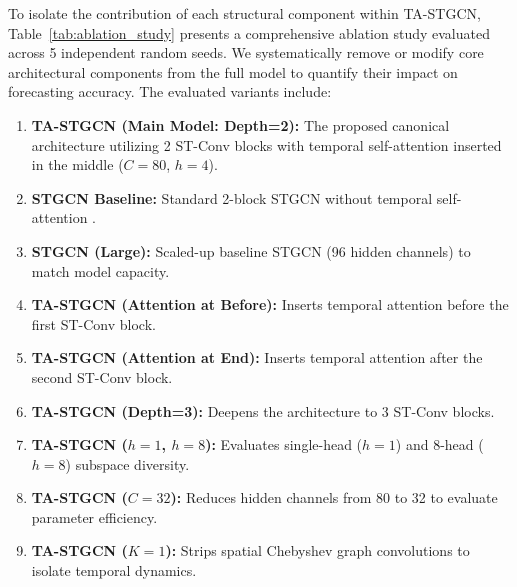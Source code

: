 \documentclass[journal,twocolumn]{IEEEtran}
\begin{document}
To isolate the contribution of each structural component within TA-STGCN, Table~\ref{tab:ablation_study} presents a comprehensive ablation study evaluated across 5 independent random seeds. We systematically remove or modify core architectural components from the full model to quantify their impact on forecasting accuracy. The evaluated variants include:
\begin{enumerate}
    \item \textbf{TA-STGCN (Main Model: Depth=2):} The proposed canonical architecture utilizing 2 ST-Conv blocks with temporal self-attention inserted in the middle ($C=80$, $h=4$).
    \item \textbf{STGCN Baseline:} Standard 2-block STGCN without temporal self-attention \cite{stgcn}.
    \item \textbf{STGCN (Large):} Scaled-up baseline STGCN (96 hidden channels) to match model capacity.
    \item \textbf{TA-STGCN (Attention at Before):} Inserts temporal attention before the first ST-Conv block.
    \item \textbf{TA-STGCN (Attention at End):} Inserts temporal attention after the second ST-Conv block.
    \item \textbf{TA-STGCN (Depth=3):} Deepens the architecture to 3 ST-Conv blocks.
    \item \textbf{TA-STGCN ($h=1$, $h=8$):} Evaluates single-head ($h=1$) and 8-head ($h=8$) subspace diversity.
    \item \textbf{TA-STGCN ($C=32$):} Reduces hidden channels from 80 to 32 to evaluate parameter efficiency.
    \item \textbf{TA-STGCN ($K=1$):} Strips spatial Chebyshev graph convolutions to isolate temporal dynamics.
\end{enumerate}
\end{document}
